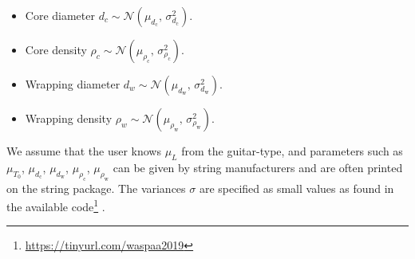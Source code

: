 \documentclass{article}
\begin{document}
\begin{sloppy}
\begin{itemize}
    \item Core diameter $ d_c \sim \mathcal{N}(\mu_{d_\text{c}},\,\sigma_{d_\text{c}}^{2})$.
    \item Core density $ \rho_c \sim \mathcal{N}(\mu_{\rho_\text{c}},\,\sigma_{\rho_\text{c}}^{2})$.
    \item Wrapping diameter $ d_w \sim \mathcal{N}(\mu_{d_\text{w}},\,\sigma_{d_\text{w}}^{2})$.
    \item Wrapping density $\rho_w \sim \mathcal{N}(\mu_{\rho_\text{w}},\,\sigma_{\rho_\text{w}}^{2})$.

\end{itemize}
%
We assume that the user knows $\mu_L$ from the guitar-type, and parameters such as $\mu_{T_0}$, $\mu_{d_\text{c}}$, $\mu_{d_\text{w}}$, $\mu_{\rho_\text{c}}$, $\mu_{\rho_\text{w}}$ can be given by string manufacturers and are often printed on the string package. The variances $\sigma$ are specified as small values as found in the available code\footnote{\url{https://tinyurl.com/waspaa2019}} .
%
%
%
%
%
%




\end{sloppy}
\end{document}
